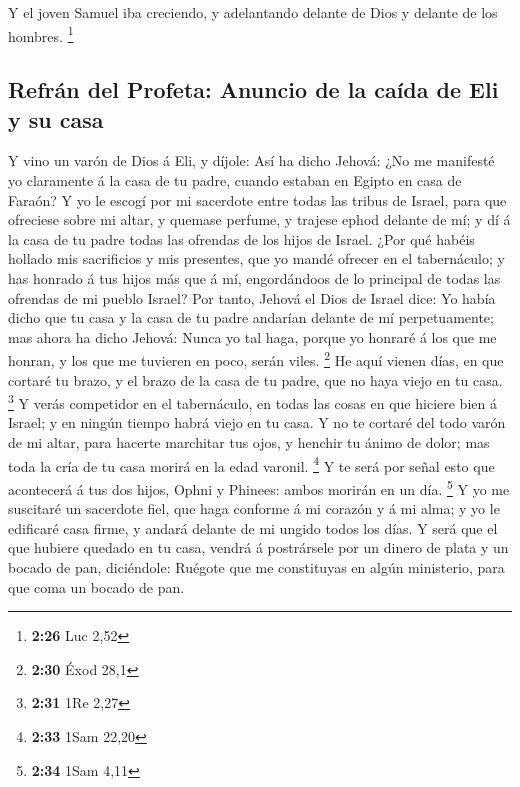  Y el joven Samuel iba creciendo, y adelantando delante
de Dios y delante de los hombres. \footnote{\textbf{2:26} Luc 2,52}

\hypertarget{refruxe1n-del-profeta-anuncio-de-la-cauxedda-de-eli-y-su-casa}{%
\subsection{Refrán del Profeta: Anuncio de la caída de Eli y su
casa}\label{refruxe1n-del-profeta-anuncio-de-la-cauxedda-de-eli-y-su-casa}}

 Y vino un varón de Dios á Eli, y díjole: Así ha dicho
Jehová: ¿No me manifesté yo claramente á la casa de tu padre, cuando
estaban en Egipto en casa de Faraón?  Y yo le escogí por
mi sacerdote entre todas las tribus de Israel, para que ofreciese sobre
mi altar, y quemase perfume, y trajese ephod delante de mí; y dí á la
casa de tu padre todas las ofrendas de los hijos de Israel.
 ¿Por qué habéis hollado mis sacrificios y mis presentes,
que yo mandé ofrecer en el tabernáculo; y has honrado á tus hijos más
que á mí, engordándoos de lo principal de todas las ofrendas de mi
pueblo Israel?  Por tanto, Jehová el Dios de Israel dice:
Yo había dicho que tu casa y la casa de tu padre andarían delante de mí
perpetuamente; mas ahora ha dicho Jehová: Nunca yo tal haga, porque yo
honraré á los que me honran, y los que me tuvieren en poco, serán viles.
\footnote{\textbf{2:30} Éxod 28,1}  He aquí vienen días,
en que cortaré tu brazo, y el brazo de la casa de tu padre, que no haya
viejo en tu casa. \footnote{\textbf{2:31} 1Re 2,27}  Y
verás competidor en el tabernáculo, en todas las cosas en que hiciere
bien á Israel; y en ningún tiempo habrá viejo en tu casa.
 Y no te cortaré del todo varón de mi altar, para hacerte
marchitar tus ojos, y henchir tu ánimo de dolor; mas toda la cría de tu
casa morirá en la edad varonil. \footnote{\textbf{2:33} 1Sam 22,20}
 Y te será por señal esto que acontecerá á tus dos hijos,
Ophni y Phinees: ambos morirán en un día. \footnote{\textbf{2:34} 1Sam
  4,11}  Y yo me suscitaré un sacerdote fiel, que haga
conforme á mi corazón y á mi alma; y yo le edificaré casa firme, y
andará delante de mi ungido todos los días.  Y será que
el que hubiere quedado en tu casa, vendrá á postrársele por un dinero de
plata y un bocado de pan, diciéndole: Ruégote que me constituyas en
algún ministerio, para que coma un bocado de pan.

